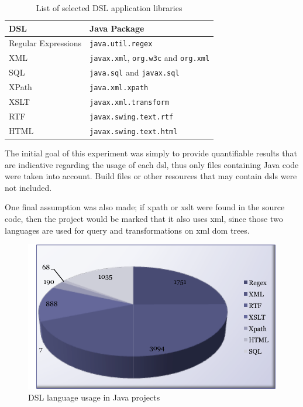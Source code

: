 \documentclass{sig-alternate}
\begin{document}
\begin{table}
\centering
\caption{List of selected DSL application libraries}
\label{tbl:dsl-list}
\begin{tabular}{l l}
 \hline
\textbf{DSL} & \textbf{Java Package}\\
\hline
Regular Expressions & \verb|java.util.regex|\\
XML & \verb|javax.xml|, \verb|org.w3c| and \verb|org.xml|\\
SQL & \verb|java.sql| and \verb|javax.sql|\\
XPath & \verb|java.xml.xpath|\\
XSLT & \verb|javax.xml.transform|\\
RTF & \verb|javax.swing.text.rtf|\\
HTML & \verb|javax.swing.text.html|\\
\hline
\end{tabular}
\end{table}

The initial goal of this experiment was simply to provide quantifiable results that are indicative regarding the usage of each {\sc dsl}, thus only files containing Java code were taken into account. Build files or other resources that may contain {\sc dsl}s were not included.

One final assumption was also made; if {\sc xpath} or {\sc xslt} were found in the source code, then the project would be marked that it also uses {\sc xml}, since those two languages are used for query and transformations on {\sc xml} {\sc dom} trees.

\begin{figure}
\centering
\includegraphics[scale=0.65]{dsl-usage}
\caption{DSL language usage in Java projects}
\label{fig:dsl-usage}
\end{figure}
\end{document}
